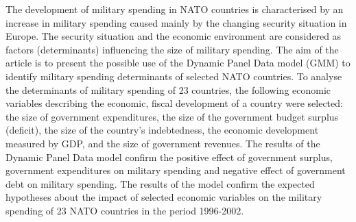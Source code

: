 
\begin{Abstrakt}
    The development of military spending in NATO countries is characterised by an increase in military spending caused mainly by the changing security situation in Europe. The security situation and the economic environment are considered as factors (determinants) influencing the size of military spending. The aim of the article is to present the possible use of the Dynamic Panel Data model (GMM) to identify military spending determinants of selected NATO countries. To analyse the determinants of military spending of 23 countries, the following economic variables describing the economic, fiscal development of a country were selected: the size of government expenditures, the size of the government budget surplus (deficit), the size of the country's indebtedness, the economic development measured by GDP, and the size of government revenues. The results of the Dynamic Panel Data model  confirm the positive effect of government surplus, government expenditures on military spending and negative effect of government debt on military spending. The results of the model confirm the expected hypotheses about the impact of selected economic variables on the military spending of 23 NATO countries in the period 1996-2002.
\end{Abstrakt}



\clearpage